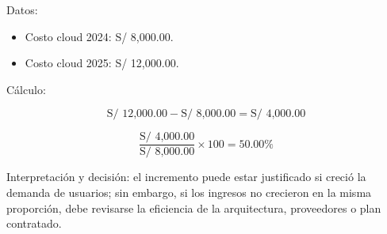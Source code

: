 Datos:

\begin{itemize}
  \item Costo cloud 2024: S/ 8,000.00.
  \item Costo cloud 2025: S/ 12,000.00.
\end{itemize}

Cálculo:

\[
\text{S/ 12,000.00} - \text{S/ 8,000.00} = \text{S/ 4,000.00}
\]

\[
\frac{\text{S/ 4,000.00}}{\text{S/ 8,000.00}} \times 100 = 50.00\%
\]

Interpretación y decisión: el incremento puede estar justificado si creció la demanda de usuarios; sin embargo, si los ingresos no crecieron en la misma proporción, debe revisarse la eficiencia de la arquitectura, proveedores o plan contratado.
